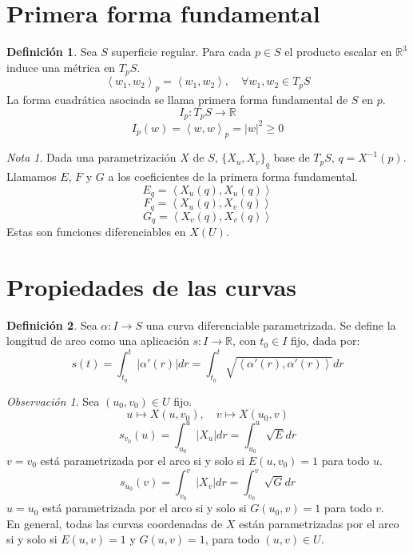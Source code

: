 \documentclass{report}
\theoremstyle{remark}
\newtheorem*{remark}{Observación}
\theoremstyle{remark}
\newtheorem*{note}{Nota}
\theoremstyle{definition}
\newtheorem{definition}{Definición}[chapter]
\theoremstyle{definition}
\theoremstyle{definition}
\begin{document}
\section{Primera forma fundamental}

\begin{definition}
    Sea $S$ superficie regular.
    Para cada $p \in S$ el producto escalar en $\mathbb{R}^3$ induce una métrica en $T_pS$.
    $$\left\langle w_1, w_2 \right\rangle _p = \left\langle w_1, w_2 \right\rangle, \quad \forall w_1, w_2 \in T_pS$$
    La forma cuadrática asociada se llama primera forma fundamental de $S$ en $p$.
    $$I_p : T_pS \to \mathbb{R}$$
    $$I_p(w) = \left\langle w, w \right\rangle _p = |w|^2 \geq 0$$
\end{definition}

\begin{note}
    Dada una parametrización $X$ de $S$, $\{ X_u, X_v \}_q$ base de $T_pS$, $q = X^{-1}(p)$.
    Llamamos $E$, $F$ y $G$ a los coeficientes de la primera forma fundamental.
    $$E_q = \left\langle X_u(q), X_u(q) \right\rangle$$
    $$F_q = \left\langle X_u(q), X_v(q) \right\rangle$$
    $$G_q = \left\langle X_v(q), X_v(q) \right\rangle$$
    Estas son funciones diferenciables en $X(U)$.
\end{note}

\section{Propiedades de las curvas}

\begin{definition}
    Sea $\alpha : I \to S$ una curva diferenciable parametrizada.
    Se define la longitud de arco como una aplicación $s : I \to \mathbb{R}$, con $t_0 \in I$ fijo, dada por:
    $$s(t) = \int^t_{t_0} |\alpha'(r)|dr = \int^t_{t_0} \sqrt{\left\langle \alpha'(r), \alpha'(r) \right\rangle} dr$$
\end{definition}

\begin{remark}
    Sea $(u_0, v_0) \in U$ fijo.
    $$u \mapsto X(u, v_0), \quad v \mapsto X(u_0, v)$$
    $$s_{v_0}(u) = \int^u_{u_0} |X_u| dr = \int^u_{u_0} \sqrt{E} dr$$
    $v = v_0$ está parametrizada por el arco si y solo si $E(u, v_0) = 1$ para todo $u$.
    $$s_{u_0}(v) = \int^v_{v_0} |X_v| dr = \int^v_{v_0} \sqrt{G} dr$$
    $u = u_0$ está parametrizada por el arco si y solo si $G(u_0, v) = 1$ para todo $v$.\\
    En general, todas las curvas coordenadas de $X$ están parametrizadas por el arco si y solo si $E(u, v) = 1$ y $G(u, v) = 1$, para todo $(u, v) \in U$.
\end{remark}
\end{document}
